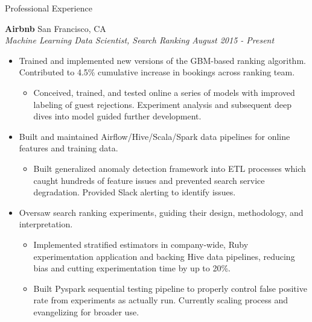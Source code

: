 \documentclass{resume} %
\begin{document}
\begin{rSection}{Professional Experience}

\vspace{0.2em}

{\bf Airbnb} \hfill San Francisco, CA \\
{\em Machine Learning Data Scientist, Search Ranking} \hfill {\em August 2015 - Present} \vspace{0.3em} 
\vspace{-0.2em}
\begin{itemize} \itemsep -0.2em
    \item Trained and implemented new versions of the GBM-based ranking algorithm. Contributed to 4.5\% cumulative increase in bookings across ranking team.
        \vspace{-0.2em}
        \begin{itemize} \itemsep -0.2em
            \item Conceived, trained, and tested online a series of models with improved labeling of guest rejections. Experiment analysis and subsequent deep dives into model guided further development.
        \end{itemize}
    \item Built and maintained Airflow/Hive/Scala/Spark data pipelines for online features and training data.
        \vspace{-0.2em}
        \begin{itemize} \itemsep -0.2em
            \item Built generalized anomaly detection framework into ETL processes which caught hundreds of feature issues and prevented search service degradation. Provided Slack alerting to identify issues.
        \end{itemize}
    \item Oversaw search ranking experiments, guiding their design, methodology, and interpretation.
        \vspace{-0.2em}
        \begin{itemize} \itemsep -0.2em
            \item Implemented stratified estimators in company-wide, Ruby experimentation application and backing Hive data pipelines, reducing bias and cutting experimentation time by up to 20\%.
            \item Built Pyspark sequential testing pipeline to properly control false positive rate from experiments as actually run. Currently scaling process and evangelizing for broader use.

\end{itemize}
\end{itemize}
\end{rSection}
\end{document}
